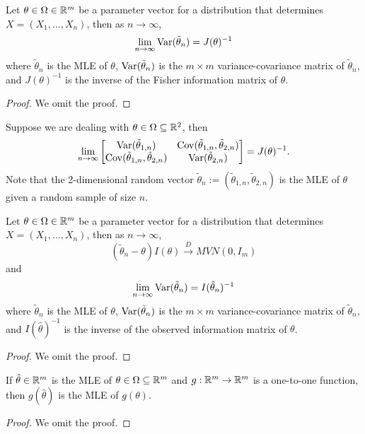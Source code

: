 \documentclass[11pt,fleqn]{book} %
\begin{document}
\begin{proposition} \label{prop:6111}
Let \(\theta \in \Omega \in \mathbb{R}^m\) be a parameter vector for a distribution that determines \(X = (X_1, \ldots, X_n)\), then as \(n\rightarrow\infty\),
\[
\lim_{n\rightarrow\infty}\operatorname{Var}(\tilde{\theta}_n) = J(\theta)^{-1}
\]
where \(\tilde{\theta}_n\) is the MLE of \(\theta\), \(\operatorname{Var}(\tilde{\theta}_n)\) is the \(m\times m\) variance-covariance matrix of \(\tilde{\theta}_n\), and \(J(\theta)^{-1}\) is the inverse of the Fisher information matrix of \(\theta\).
\end{proposition}
\begin{proof} We omit the proof.\end{proof}

\begin{example} \label{eg:6112}
Suppose we are dealing with \(\theta \in \Omega \subseteq\mathbb{R}^2\), then
\[
\lim_{n\rightarrow\infty}
\begin{bmatrix}
\operatorname{Var}(\tilde{\theta}_{1, n}) & \operatorname{Cov}(\tilde{\theta}_{1, n}, \tilde{\theta}_{2, n}) \\
\operatorname{Cov}(\tilde{\theta}_{1, n}, \tilde{\theta}_{2, n}) & \operatorname{Var}(\tilde{\theta}_{2, n})
\end{bmatrix}
= J(\theta)^{-1}.
\]
\indent Note that the 2-dimensional random vector \(\tilde{\theta}_n := (\tilde{\theta}_{1, n}, \tilde{\theta}_{2, n})\) is the MLE of \(\theta\) given a random sample of size \(n\).
\end{example}

\begin{proposition} \label{prop:6113}
Let \(\theta \in \Omega \in \mathbb{R}^m\) be a parameter vector for a distribution that determines \(X = (X_1, \ldots, X_n)\), then as \(n\rightarrow\infty\),
\[
(\tilde{\theta}_n - \theta)I(\theta) \xrightarrow{D} MVN(0, I_m)
\]
and
\[
\lim_{n\rightarrow\infty} \operatorname{Var}(\tilde{\theta}_n) = I(\hat{\theta}_n)^{-1}
\]
where \(\tilde{\theta}_n\) is the MLE of \(\theta\), \(\operatorname{Var}(\tilde{\theta}_n)\) is the \(m\times m\) variance-covariance matrix of \(\tilde{\theta}_n\), and \(I(\hat{\theta})^{-1}\) is the inverse of the observed information matrix of \(\theta\).
\end{proposition}
\begin{proof} We omit the proof.\end{proof}

\begin{theorem} \label{thm:6114}
If \(\hat{\theta} \in \mathbb{R}^m\) is the MLE of \(\theta \in \Omega \subseteq \mathbb{R}^m\) and \(g:\mathbb{R}^m\rightarrow\mathbb{R}^m\) is a one-to-one function, then \(g(\hat{\theta})\) is the MLE of \(g(\theta)\).
\end{theorem}
\begin{proof} We omit the proof.\end{proof}
\end{document}
